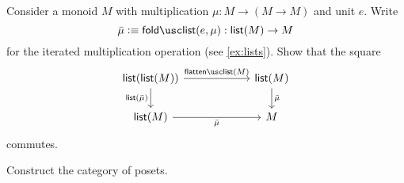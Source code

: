 \begin{exercises}
\item Consider a monoid $M$ with multiplication $\mu:M\to (M\to M)$ and unit $e$. Write
  \begin{equation*}
    \bar{\mu}\defeq\foldlist(e,\mu):\lst(M)\to M
  \end{equation*}
  for the iterated multiplication operation (see \cref{ex:lists}). Show that the square
  \begin{equation*}
    \begin{tikzcd}[column sep=6em]
      \lst(\lst(M)) \arrow[r,"\flattenlist(M)"] \arrow[d,swap,"\lst(\bar{\mu})"] & \lst(M) \arrow[d,"\bar{\mu}"] \\
        \lst(M) \arrow[r,swap,"\bar{\mu}"] & M
    \end{tikzcd}
  \end{equation*}
  commutes. 
\item Construct the category of posets.
\end{exercises}
